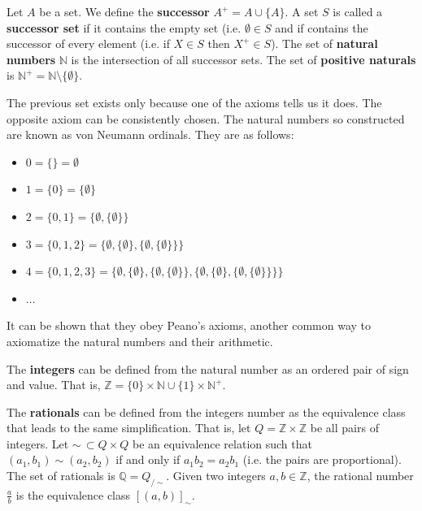 \documentclass{article}
\begin{document}
\begin{defn}\label{defn_successor_set}
	Let $A$ be a set. We define the \textbf{successor} $A^+ = A \cup \{A\}$. A set $S$ is called a \textbf{successor set} if it contains the empty set (i.e. $\emptyset \in S$ and if contains the successor of every element (i.e. if $X \in S$ then $X^+ \in S$). The set of \textbf{natural numbers} $\mathbb{N}$ is the intersection of all successor sets. The set of \textbf{positive naturals} is $\mathbb{N}^+ = \mathbb{N} \setminus \{ \emptyset \}$.
\end{defn}
\begin{remark}
	The previous set exists only because one of the axioms tells us it does. The opposite axiom can be consistently chosen. The natural numbers so constructed are known as von Neumann ordinals. They are as follows:
	\begin{itemize}
		\item $0 = \{ \} = \emptyset$
		\item $1 = \{ 0 \} = \{ \emptyset \}$
		\item $2 = \{0, 1\} = \{ \emptyset, \{ \emptyset\} \}$
		\item $3 = \{0, 1, 2\} = \{ \emptyset, \{ \emptyset\}, \{ \emptyset, \{ \emptyset\} \} \}$
		\item $4 = \{0, 1, 2, 3\} = \{ \emptyset, \{ \emptyset\}, \{ \emptyset, \{ \emptyset\} \}, \{ \emptyset, \{ \emptyset\}, \{ \emptyset, \{ \emptyset\} \} \} \}$
		\item ...
	\end{itemize}
	It can be shown that they obey Peano's axioms, another common way to axiomatize the natural numbers and their arithmetic.
\end{remark}

\begin{defn}
	The \textbf{integers} can be defined from the natural number as an ordered pair of sign and value. That is, $\mathbb{Z} = \{ 0 \} \times \mathbb{N} \cup \{ 1 \} \times \mathbb{N}^+$.
\end{defn}

\begin{defn}
	The \textbf{rationals} can be defined from the integers number as the equivalence class that leads to the same simplification. That is, let $Q = \mathbb{Z} \times \mathbb{Z}$ be all pairs of integers. Let $\sim \, \subset Q \times Q$ be an equivalence relation such that $(a_1, b_1) \sim (a_2, b_2)$ if and only if $a_1 b_2 = a_2 b_1$ (i.e. the pairs are proportional). The set of rationals is $\mathbb{Q} = Q_{/\sim}$. Given two integers $a, b \in \mathbb{Z}$, the rational number $\frac{a}{b}$ is the equivalence class $[(a,b)]_{\sim}$.
\end{defn}
\end{document}
